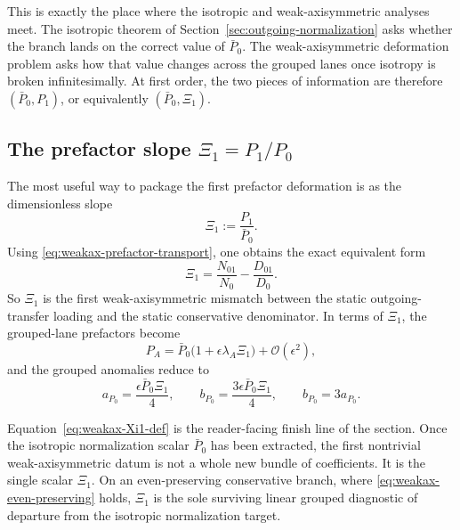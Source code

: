 \documentclass[11pt]{article}
\theoremstyle{definition}
\newcommand{\XiOne}{\ensuremath{\Xi_1}}
\newcommand{\cO}{\mathcal O}
\begin{document}
This is exactly the place where the isotropic and weak-axisymmetric analyses meet. The isotropic theorem of Section~\ref{sec:outgoing-normalization} asks whether the branch lands on the correct value of $\bar P_0$. The weak-axisymmetric deformation problem asks how that value changes across the grouped lanes once isotropy is broken infinitesimally. At first order, the two pieces of information are therefore $(\bar P_0,P_1)$, or equivalently $(\bar P_0,\XiOne)$.

\subsection{The prefactor slope \texorpdfstring{$\Xi_1=P_1/P_0$}{Xi1=P1/P0}}

The most useful way to package the first prefactor deformation is as the dimensionless slope
\begin{equation}
 \boxed{\XiOne:=\frac{P_1}{\bar P_0}.}
 \label{eq:weakax-Xi1-def}
\end{equation}
Using \eqref{eq:weakax-prefactor-transport}, one obtains the exact equivalent form
\begin{equation}
 \boxed{\XiOne=\frac{N_{01}}{N_0}-\frac{D_{01}}{D_0}.}
 \label{eq:weakax-Xi1-ratio}
\end{equation}
So $\XiOne$ is the first weak-axisymmetric mismatch between the static outgoing-transfer loading and the static conservative denominator. In terms of $\XiOne$, the grouped-lane prefactors become
\begin{equation}
 P_A
 =
 \bar P_0\bigl(1+\epsilon\lambda_A\XiOne\bigr)
 +\cO(\epsilon^2),
 \label{eq:weakax-prefactor-Xi1}
\end{equation}
and the grouped anomalies reduce to
\begin{equation}
 a_{P_0}=\frac{\epsilon\bar P_0\XiOne}{4},
 \qquad
 b_{P_0}=\frac{3\epsilon\bar P_0\XiOne}{4},
 \qquad
 b_{P_0}=3a_{P_0}.
 \label{eq:weakax-prefactor-Xi1-anomalies}
\end{equation}

Equation~\eqref{eq:weakax-Xi1-def} is the reader-facing finish line of the section. Once the isotropic normalization scalar $\bar P_0$ has been extracted, the first nontrivial weak-axisymmetric datum is not a whole new bundle of coefficients. It is the single scalar $\XiOne$. On an even-preserving conservative branch, where \eqref{eq:weakax-even-preserving} holds, $\XiOne$ is the sole surviving linear grouped diagnostic of departure from the isotropic normalization target.
\end{document}
